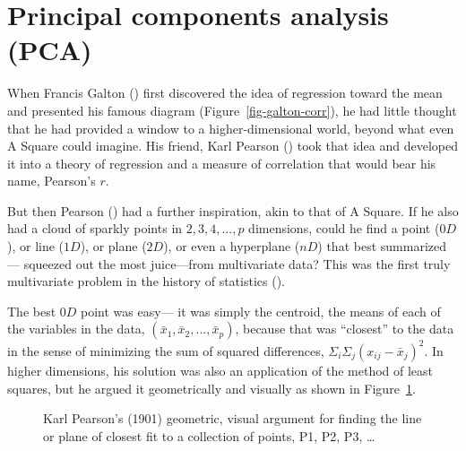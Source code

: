 \documentclass[
  letterpaper,
  10pt,
  krantz2]{krantz}
\begin{document}
\section{Principal components analysis (PCA)}\label{sec-pca}

When Francis Galton () first discovered
the idea of regression toward the mean and presented his famous diagram
(Figure~\ref{fig-galton-corr}), he had little thought that he had
provided a window to a higher-dimensional world, beyond what even A
Square could imagine. His friend, Karl Pearson
() took that idea and developed it into
a theory of regression and a measure of correlation that would bear his
name, Pearson's \(r\).

But then Pearson () had a further
inspiration, akin to that of A Square. If he also had a cloud of sparkly
points in \(2, 3, 4, ..., p\) dimensions, could he find a point
(\(0D\)), or line (\(1D\)), or plane (\(2D\)), or even a hyperplane
(\(nD\)) that best summarized --- squeezed out the most juice---from
multivariate data? This was the first truly multivariate problem in the
history of statistics ().

The best \(0D\) point was easy--- it was simply the centroid, the means
of each of the variables in the data,
\((\bar{x}_1, \bar{x}_2, ..., \bar{x}_p)\), because that was ``closest''
to the data in the sense of minimizing the sum of squared differences,
\(\Sigma_i\Sigma_j (x_{ij} - \bar{x}_j)^2\). In higher dimensions, his
solution was also an application of the method of least squares, but he
argued it geometrically and visually as shown in
Figure~\ref{fig-Pearson1901}.

\begin{figure}


\caption{\label{fig-Pearson1901}Karl Pearson's (1901) geometric, visual
argument for finding the line or plane of closest fit to a collection of
points, P1, P2, P3, \ldots{}}

\end{figure}%
\end{document}
